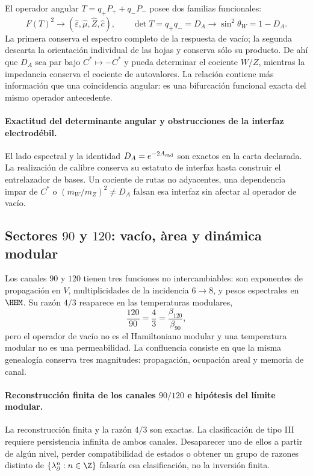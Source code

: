El operador angular \(T=q_+P_++q_-P_-\) posee dos familias funcionales:
\begin{equation}
F(T)^2\longrightarrow
(\widehat\varepsilon,\widehat\mu,\widehat Z,\widehat c),
\qquad
\det T=q_+q_-=D_A\longrightarrow
\sin^2\theta_W=1-D_A.
\label{eq:atlas-DA-confluence}
\end{equation}
La primera conserva el espectro completo de la respuesta de vac\'io; la
segunda descarta la orientaci\'on individual de las hojas y conserva s\'olo su
producto. De ah\'i que \(D_A\) sea par bajo \(C^*\mapsto-C^*\) y pueda
determinar el cociente \(W/Z\), mientras la impedancia conserva el cociente
de autovalores. La relaci\'on contiene m\'as informaci\'on que una
coincidencia angular: es
una bifurcaci\'on funcional exacta del mismo operador antecedente.

\paragraph{Exactitud del determinante angular y obstrucciones de la interfaz electrodébil.}
El lado espectral y la identidad \(D_A=e^{-2A_{\rm rad}}\) son exactos en la
carta declarada. La realizaci\'on de calibre conserva su estatuto de interfaz hasta
construir el entrelazador de bases. Un cociente de rutas no adyacentes, una
dependencia impar de \(C^*\) o \((m_W/m_Z)^2\ne D_A\) falsan esa interfaz sin
afectar al operador de vac\'io.

\subsection{Sectores \(90\) y \(120\): vac\'io, \`area y din\'amica modular}

Los canales \(90\) y \(120\) tienen tres funciones no intercambiables:
son exponentes de propagaci\'on en \(V\), multiplicidades de la incidencia
\(6\to8\), y pesos espectrales en \(\HHM\). Su raz\'on \(4/3\) reaparece en
las temperaturas modulares,
\[
\frac{120}{90}=\frac43=\frac{\beta_{120}}{\beta_{90}},
\]
pero el operador de vac\'io no es el Hamiltoniano modular y una temperatura
modular no es una permeabilidad. La confluencia consiste en que la misma
genealog\'ia conserva tres magnitudes: propagaci\'on, ocupaci\'on areal y
memoria de canal.

\paragraph{Reconstrucción finita de los canales \(90/120\) e hipótesis del límite modular.}
La reconstrucci\'on finita y la raz\'on \(4/3\) son exactas. La clasificaci\'on
de tipo III requiere persistencia infinita de ambos canales. Desaparecer uno
de ellos a partir de alg\'un nivel, perder compatibilidad de estados o obtener
un grupo de razones distinto de
\(\{\lambda_\partial^n:n\in\Z\}\) falsar\'ia esa clasificaci\'on, no la
inversi\'on finita.

